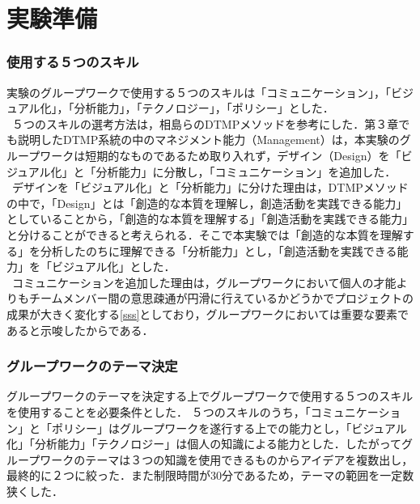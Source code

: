 \documentclass{funthesis}
\begin{document}
\section{実験準備}
\subsubsection{使用する５つのスキル}
実験のグループワークで使用する５つのスキルは「コミュニケーション」，「ビジュアル化」，「分析能力」，「テクノロジー」，「ポリシー」とした．\\
\ ５つのスキルの選考方法は，相島ら\cite{A5}のDTMPメソッドを参考にした．第３章でも説明したDTMP系統の中のマネジメント能力（Management）は，本実験のグループワークは短期的なものであるため取り入れず，デザイン（Design）を「ビジュアル化」と「分析能力」に分散し，「コミュニケーション」を追加した．\\
\ デザインを「ビジュアル化」と「分析能力」に分けた理由は，DTMPメソッドの中で，「Design」とは「創造的な本質を理解し，創造活動を実践できる能力」としていることから，「創造的な本質を理解する」「創造活動を実践できる能力」と分けることができると考えられる．そこで本実験では「創造的な本質を理解する」を分析したのちに理解できる「分析能力」とし，「創造活動を実践できる能力」を「ビジュアル化」とした．\\
\ コミュニケーションを追加した理由は，グループワークにおいて個人の才能よりもチームメンバー間の意思疎通が円滑に行えているかどうかでプロジェクトの成果が大きく変化する\ref{sss}としており，グループワークにおいては重要な要素であると示唆したからである．


\subsubsection{グループワークのテーマ決定}
グループワークのテーマを決定する上でグループワークで使用する５つのスキルを使用することを必要条件とした．
５つのスキルのうち，「コミュニケーション」と「ポリシー」はグループワークを遂行する上での能力とし，「ビジュアル化」「分析能力」「テクノロジー」は個人の知識による能力とした．したがってグループワークのテーマは３つの知識を使用できるものからアイデアを複数出し，最終的に２つに絞った．また制限時間が30分であるため，テーマの範囲を一定数狭くした．
\end{document}
